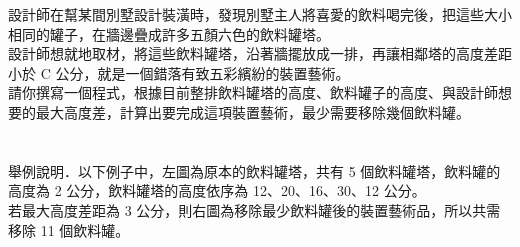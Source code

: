 設計師在幫某間別墅設計裝潢時，發現別墅主人將喜愛的飲料喝完後，把這些大小相同的罐子，在牆邊疊成許多五顏六色的飲料罐塔。\\
設計師想就地取材，將這些飲料罐塔，沿著牆擺放成一排，再讓相鄰塔的高度差距小於 C 公分，就是一個錯落有致五彩繽紛的裝置藝術。\\
請你撰寫一個程式，根據目前整排飲料罐塔的高度、飲料罐子的高度、與設計師想要的最大高度差，計算出要完成這項裝置藝術，最少需要移除幾個飲料罐。\\
\\
\\
舉例說明．以下例子中，左圖為原本的飲料罐塔，共有 5 個飲料罐塔，飲料罐的高度為 2 公分，飲料罐塔的高度依序為 12、20、16、30、12 公分。\\
若最大高度差距為 3 公分，則右圖為移除最少飲料罐後的裝置藝術品，所以共需移除 11 個飲料罐。\\
